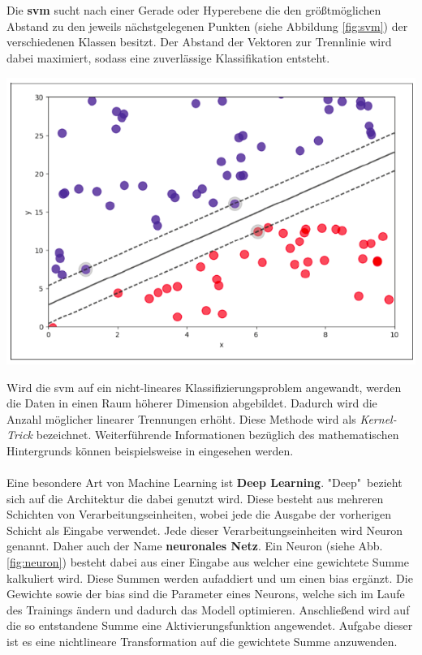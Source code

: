 \documentclass[
    12pt, %
    DIV10,
    ngerman, %
    a4paper, %
    oneside, %
    titlepage, %
    parskip=half, %
    headings=normal, %
    listof=totoc, %
    bibliography=totoc, %
    index=totoc, %
    captions=tableheading, %
    final %
]{scrreprt}
\begin{document}
\\\\
Die \textbf{\acl{svm}} sucht nach einer Gerade oder Hyperebene die den grö{\ss}tmöglichen Abstand zu den jeweils nächstgelegenen Punkten (siehe Abbildung \ref{fig:svm}) der verschiedenen Klassen besitzt. Der Abstand der Vektoren zur Trennlinie wird dabei maximiert, sodass eine zuverlässige Klassifikation entsteht.
\begin{center}
\includegraphics[scale=0.4]{img/svm.png}
\label{fig:svm}
\end{center}
Wird die \ac{svm} auf ein nicht-lineares Klassifizierungsproblem angewandt, werden die Daten in einen Raum höherer Dimension abgebildet. Dadurch wird die Anzahl möglicher linearer Trennungen erhöht. Diese Methode wird als \emph{Kernel-Trick} bezeichnet. Weiterführende Informationen bezüglich des mathematischen Hintergrunds können beispielsweise in \textcite{nguyen2018machine} eingesehen werden.
\\\\
Eine besondere Art von Machine Learning ist \textbf{Deep Learning}. "Deep"\ bezieht sich auf die Architektur die dabei genutzt wird. Diese besteht aus mehreren Schichten von Verarbeitungseinheiten, wobei jede die Ausgabe der vorherigen Schicht als Eingabe verwendet. Jede dieser Verarbeitungseinheiten wird Neuron genannt. Daher auch der Name \textbf{neuronales Netz}. Ein Neuron (siehe Abb. \ref{fig:neuron}) besteht dabei aus einer Eingabe aus welcher eine gewichtete Summe kalkuliert wird. Diese Summen werden aufaddiert und um einen bias ergänzt. Die Gewichte sowie der bias sind die Parameter eines Neurons, welche sich im Laufe des Trainings ändern und dadurch das Modell optimieren. Anschlie{\ss}end wird auf die so entstandene Summe eine Aktivierungsfunktion angewendet. Aufgabe dieser ist es eine nichtlineare Transformation auf die gewichtete Summe anzuwenden.
\end{document}
